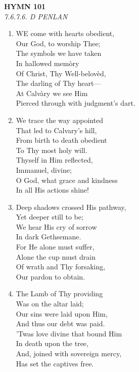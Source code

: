 \newpage
\begin{center}
    {\Large \textbf{HYMN 101\textdagger{}}}
    \\
    \textit{7.6.7.6. D PENLAN}
\end{center}
\vspace{1em}

\begin{enumerate}
    \item WE come with hearts obedient, \\
        Our God, to worship Thee; \\
        The symbols we have taken \\
        In hallowed mem\`ory \\
        Of Christ, Thy Well-belov\`ed, \\
        The darling of Thy heart--- \\
        At Calv\`ary we see Him \\
        Pierced through with judgment's dart.

    \item We trace the way appointed \\
        That led to Calvary's hill, \\
        From birth to death obedient \\
        To Thy most holy will. \\
        Thyself in Him reflected, \\
        Immanuel, divine; \\
        O God, what grace and kindness \\
        In all His actions shine!

    \item Deep shadows crossed His pathway, \\
        Yet deeper still to be; \\
        We hear His cry of sorrow \\
        In dark Gethsemane. \\
        For He alone must suffer, \\
        Alone the cup must drain \\
        Of wrath and Thy forsaking, \\
        Our pardon to obtain.

    \item The Lamb of Thy providing \\
        Was on the altar laid; \\
        Our sins were laid upon Him, \\
        And thus our debt was paid. \\
        'Twas love divine that bound Him \\
        In death upon the tree, \\
        And, joined with sovereign mercy, \\
        Has set the captives free.


\end{enumerate}
